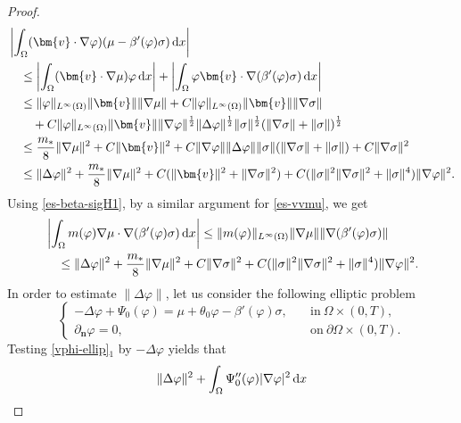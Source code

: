 \documentclass[11pt,reqno]{amsart}
\def\d{{\rm d}}
\def\vv{\bm{v}}
\begin{document}
\begin{proof}
%
\begin{align}
& \left|
\int_{\Omega} (\vv \cdot \nabla \varphi) (\mu - \beta'(\varphi) \sigma)\, \d x \right|
\notag \\
&\quad \leq \left| \int_{\Omega} (\vv \cdot \nabla  \mu)  \varphi \, \d x\right|
+ \left|\int_\Omega \varphi \vv \cdot \nabla (\beta'(\varphi) \sigma) \, \d x\right|
\notag\\
&\quad \leq \| \varphi\|_{L^\infty(\Omega)}\|\vv\| \| \nabla  \mu\|
+ C\|\varphi\|_{L^\infty(\Omega)}\|\vv\| \|\nabla  \sigma\|
\notag\\
&\qquad
+  C \|\varphi\|_{L^\infty(\Omega)}\|\vv\|\|\nabla \varphi\|^\frac12
\|\Delta \varphi\|^\frac12
\|\sigma\|^\frac12(\|\nabla \sigma\|+\|\sigma\|)^\frac12
\notag\\
&\quad \leq \frac{m_*}{8}\|\nabla \mu\|^2+ C\|\vv\|^2 + C\|\nabla \varphi\|
\|\Delta \varphi\|
\|\sigma\|(\|\nabla \sigma\|+\|\sigma\|) + C\|\nabla \sigma\|^2
\notag\\
&\quad \leq  \|\Delta \varphi\|^2 + \frac{m_*}{8}\|\nabla \mu\|^2+ C(\|\vv\|^2+\|\nabla \sigma\|^2)
 +C  (\|\sigma\|^2 \|\nabla \sigma\|^2 +\|\sigma\|^4) \|\nabla \varphi\|^2.
\label{es-vvmu}
\end{align}
%
Using \eqref{es-beta-sigH1}, by a similar argument for \eqref{es-vvmu}, we get
%
\begin{align}
& \left|\int_{\Omega} m(\varphi) \nabla \mu \cdot \nabla (\beta'(\varphi) \sigma)  \, \d x\right|
 \leq \|m(\varphi)\|_{L^\infty(\Omega)}\|\nabla \mu\| \|\nabla (\beta'(\varphi) \sigma)\|
\notag\\
&\quad \leq \|\Delta\varphi\|^2 + \frac{m_*}{8}\|\nabla \mu\|^2 +C\|\nabla \sigma\|^2
+C  (\|\sigma\|^2 \|\nabla \sigma\|^2 + \|\sigma\|^4) \|\nabla \varphi\|^2.
\label{es-mmu}
\end{align}
%
In order to estimate $\|\Delta\varphi\|$, let us consider the following elliptic problem
%
\begin{equation}
\begin{cases}
-\Delta \varphi + \Psi_0(\varphi)= \mu+\theta_0\varphi-\beta'(\varphi)\sigma,&\quad \text{in}\ \Omega\times(0,T),\\
\partial_{\bm{n}}\varphi=0,&\quad \text{on}\ \partial\Omega\times(0,T).
\end{cases}
\label{vphi-ellip}
\end{equation}
%
Testing \eqref{vphi-ellip}$_1$ by $-\Delta \varphi$ yields that
%
\begin{align}
\|\Delta \varphi\|^2
+\int_{\Omega}\Psi_0''(\varphi)|\nabla \varphi|^2 \, \d x

\end{align}
\end{proof}
\end{document}

